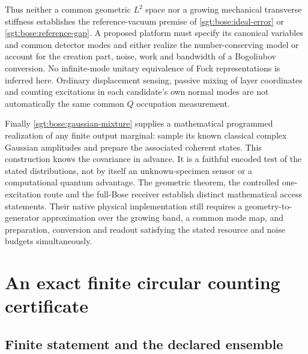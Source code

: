 \documentclass[aps,pra,reprint,superscriptaddress,longbibliography]{revtex4-2}
\begin{document}
Thus neither a common geometric $L^2$ space nor a growing mechanical
transverse stiffness establishes the reference-vacuum premise of
\eqref{sgt:bose:ideal-error} or \eqref{sgt:bose:reference-gap}.
A proposed platform must specify its canonical variables and common
detector modes and either realize the number-conserving model or
account for the creation part, noise, work and bandwidth of a
Bogoliubov conversion.  No infinite-mode unitary equivalence of Fock
representations is inferred here.  Ordinary displacement sensing,
passive mixing of layer coordinates and counting excitations in each
candidate's own normal modes are not automatically the same common
$Q$ occupation measurement.

Finally \eqref{sgt:bose:gaussian-mixture} supplies a mathematical
programmed realization of any finite output marginal: sample its
known classical complex Gaussian amplitudes and prepare the associated
coherent states.  This construction knows the covariance in advance.
It is a faithful encoded test of the stated distributions, not by
itself an unknown-specimen sensor or a computational quantum
advantage.  The geometric theorem, the controlled one-excitation
route and the full-Bose receiver establish distinct mathematical
access statements.  Their native physical implementation still
requires a geometry-to-generator approximation over the growing
band, a common mode map, and preparation, conversion and readout
satisfying the stated resource and noise budgets simultaneously.

\section{An exact finite circular counting certificate}
\label{sgt:finite:appendix}

\subsection{Finite statement and the declared ensemble}
\label{sgt:finite:certificate}
\end{document}
